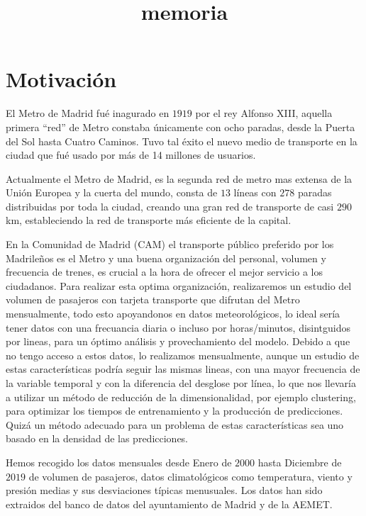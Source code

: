 \documentclass[11pt]{article}
\title{memoria}
\begin{document}
    
    \maketitle
    
    

    
    \hypertarget{motivaciuxf3n}{%
\section{Motivación}\label{motivaciuxf3n}}

    El Metro de Madrid fué inagurado en \(1919\) por el rey Alfonso XIII,
aquella primera ``red'' de Metro constaba únicamente con ocho paradas,
desde la Puerta del Sol hasta Cuatro Caminos. Tuvo tal éxito el nuevo
medio de transporte en la ciudad que fué usado por más de 14 millones de
usuarios.

Actualmente el Metro de Madrid, es la segunda red de metro mas extensa
de la Unión Europea y la cuerta del mundo, consta de \(13\) líneas con
\(278\) paradas distribuidas por toda la ciudad, creando una gran red de
transporte de casi \(290\)km, estableciendo la red de transporte más
eficiente de la capital.

    En la Comunidad de Madrid (CAM) el transporte público preferido por los
Madrileños es el Metro y una buena organización del personal, volumen y
frecuencia de trenes, es crucial a la hora de ofrecer el mejor servicio
a los ciudadanos. Para realizar esta optima organización, realizaremos
un estudio del volumen de pasajeros con tarjeta transporte que difrutan
del Metro mensualmente, todo esto apoyandonos en datos meteorológicos,
lo ideal sería tener datos con una frecuancia diaria o incluso por
horas/minutos, disintguidos por lineas, para un óptimo análisis y
provechamiento del modelo. Debido a que no tengo acceso a estos datos,
lo realizamos mensualmente, aunque un estudio de estas características
podría seguir las mismas lineas, con una mayor frecuencia de la variable
temporal y con la diferencia del desglose por línea, lo que nos llevaría
a utilizar un método de reducción de la dimensionalidad, por ejemplo
clustering, para optimizar los tiempos de entrenamiento y la producción
de predicciones. Quizá un método adecuado para un problema de estas
características sea uno basado en la densidad de las predicciones.

    Hemos recogido los datos mensuales desde Enero de \(2000\) hasta
Diciembre de \(2019\) de volumen de pasajeros, datos climatológicos como
temperatura, viento y presión medias y sus desviaciones típicas
menusuales. Los datos han sido extraidos del banco de datos del
ayuntamiento de Madrid y de la AEMET.
\end{document}
